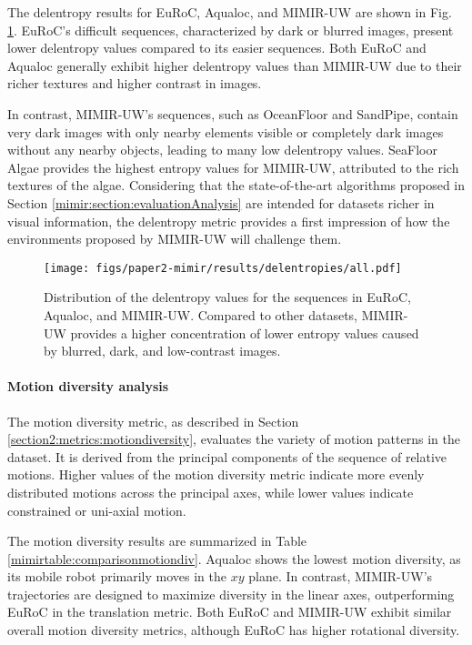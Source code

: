 The delentropy results for EuRoC, Aqualoc, and MIMIR-UW are shown in Fig. \ref{mimir:fig:delentropygraph}. EuRoC's difficult sequences, characterized by dark or blurred images, present lower delentropy values compared to its easier sequences. Both EuRoC and Aqualoc generally exhibit higher delentropy values than MIMIR-UW due to their richer textures and higher contrast in images.

In contrast, MIMIR-UW's sequences, such as OceanFloor and SandPipe, contain very dark images with only nearby elements visible or completely dark images without any nearby objects, leading to many low delentropy values. SeaFloor Algae provides the highest entropy values for MIMIR-UW, attributed to the rich textures of the algae. Considering that the state-of-the-art algorithms proposed in Section \ref{mimir:section:evaluationAnalysis} are intended for datasets richer in visual information, the delentropy metric provides a first impression of how the environments proposed by MIMIR-UW will challenge them.

\begin{figure}[ht!]
\centering
    \texttt{[image: figs/paper2-mimir/results/delentropies/all.pdf]}



\caption[Distribution of the delentropy values for the sequences in EuRoC, Aqualoc, and MIMIR-UW]{Distribution of the delentropy values for the sequences in EuRoC, Aqualoc, and MIMIR-UW. Compared to other datasets, MIMIR-UW provides a higher concentration of lower entropy values caused by blurred, dark, and low-contrast images.}
\label{mimir:fig:delentropygraph}
\end{figure}


\paragraph*{Motion diversity analysis}
The motion diversity metric, as described in Section \ref{section2:metrics:motiondiversity}, evaluates the variety of motion patterns in the dataset. It is derived from the principal components of the sequence of relative motions. Higher values of the motion diversity metric indicate more evenly distributed motions across the principal axes, while lower values indicate constrained or uni-axial motion.

The motion diversity results are summarized in Table \ref{mimirtable:comparisonmotiondiv}. Aqualoc shows the lowest motion diversity, as its mobile robot primarily moves in the $xy$ plane. In contrast, MIMIR-UW's trajectories are designed to maximize diversity in the linear axes, outperforming EuRoC in the translation metric. Both EuRoC and MIMIR-UW exhibit similar overall motion diversity metrics, although EuRoC has higher rotational diversity.

